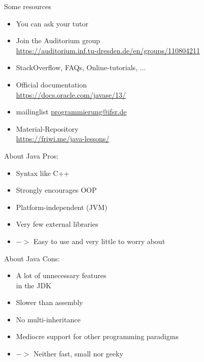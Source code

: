 \begin{frame}{Some resources}
	\begin{itemize}
		\item You can ask your tutor
		\item Join the Auditorium group \hfill \\
			\url{https://auditorium.inf.tu-dresden.de/en/groups/110804211}
		\item StackOverflow, FAQs, Online-tutorials, ... \hfill \\
		\item Official documentation \hfill \\
			\url{https://docs.oracle.com/javase/13/}
           \item mailinglist \url{programmierung@ifsr.de}
	\item Material-Repository \\
		\url{https://friwi.me/java-lessons/}
	\end{itemize}
\end{frame}

\begin{frame}{About Java}
	Pros:
	\begin{itemize}
		\item Syntax like C++
		\item Strongly encourages OOP
		\item Platform-independent (JVM)
		\item Very few external libraries
		\item[] $->$ Easy to use and very little to worry about
	\end{itemize}
\end{frame}

\begin{frame}{About Java}
	Cons:
	\begin{itemize}
		\item A lot of unnecessary features \\ in the JDK
		\item Slower than assembly
		\item No multi-inheritance
		\item Mediocre support for other programming paradigms
		\item[] $->$ Neither fast, small nor geeky
	\end{itemize}
\end{frame}

